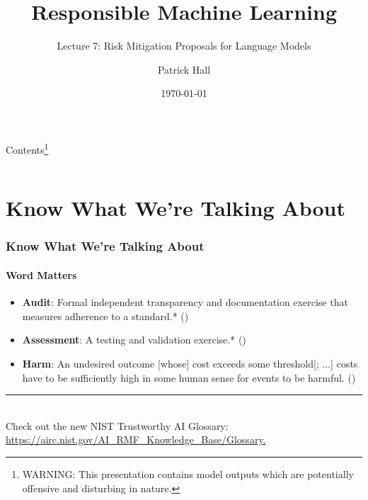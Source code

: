 \documentclass[11pt,
               aspectratio=169,
               hyperref={colorlinks}
               ]{beamer}
\author{Patrick Hall}
\title{Responsible Machine Learning}
\subtitle{Lecture 7: Risk Mitigation Proposals for Language Models}
\institute{The George Washington University}
\date{\today}
\begin{document}
	
	\maketitle
	
	\begin{frame}{Contents\footnote{\tiny{WARNING: This presentation contains model outputs which are potentially offensive and disturbing in nature.}}}

	\begin{columns}[onlytextwidth]
		\tableofcontents[sections = 1-8]
		\tableofcontents[sections = 9-17]
	\end{columns}

	\end{frame}


	\section{Know What We're Talking About}

		\begin{frame}
	
			\frametitle{Know What We're Talking About}
			\framesubtitle{Word Matters}
			
			\begin{itemize}
				\item \textbf{Audit}: Formal independent transparency and documentation exercise that measures adherence to a standard.* (\cite{hasan2022algorithmic})
				
				\item \textbf{Assessment}: A testing and validation exercise.* (\cite{hasan2022algorithmic})
				
				\item \textbf{Harm}: An undesired outcome [whose] cost exceeds some threshold[; ...] costs have to be sufficiently high in some human sense for events to be harmful. (\cite{atherton2023language})		
			\end{itemize}
					
			\vspace{10pt}
			\par\noindent\rule{100pt}{0.4pt}\\
			\vspace{5pt}
			\scriptsize{Check out the new NIST Trustworthy AI Glossary: \url{https://airc.nist.gov/AI_RMF_Knowledge_Base/Glossary.}}

		\end{frame}
\end{document}
